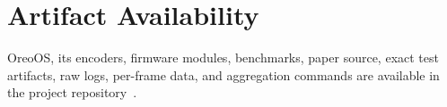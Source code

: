 \documentclass[11pt,twocolumn]{article}
\begin{document}
\section*{Artifact Availability}

OreoOS, its encoders, firmware modules, benchmarks, paper source, exact test
artifacts, raw logs, per-frame data, and aggregation commands are available in
the project repository~\cite{bhattacharya2026oreo}.

\begingroup
\fontsize{7pt}{7.4pt}\selectfont


\endgroup
\end{document}
